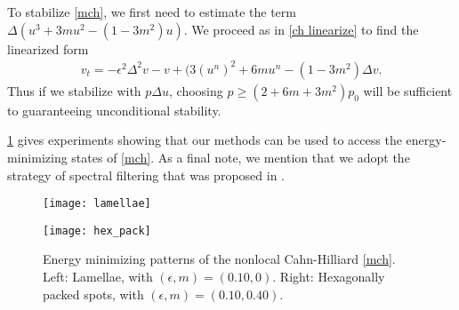 To stabilize \cref{mch}, we first need to estimate the term $\Delta(u^3 + 3mu^2-(1-3m^2)u)$. We proceed as in \cref{ch linearize} to find the linearized form
\begin{align}
v_t = -\epsilon^2\Delta^2 v - v + (3(u^n)^2 + 6mu^n - (1-3m^2) \Delta v.
\end{align}
Thus if we stabilize with $p\Delta u$, choosing $p \geq (2+6m+3m^2)p_0$ will be sufficient to guaranteeing unconditional stability.

\cref{fig:mchp energy minimizers} gives experiments showing that our methods can be used to access the energy-minimizing states of \cref{mch}. As a final note, we mention that we adopt the strategy of spectral filtering that was proposed in \cite{choksi20112d}.

\begin{figure}[htb!]
        \centering
\begin{minipage}{0.46\textwidth}
       \texttt{[image: lamellae]}
\end{minipage}
\begin{minipage}{0.46\textwidth}
\centering
       \texttt{[image: hex\_pack]}
\end{minipage}
\caption[{Energy minimizing patterns of the nonlocal Cahn-Hilliard}]{Energy minimizing patterns of the nonlocal Cahn-Hilliard \cref{mch}. Left: Lamellae, with $(\epsilon,m)=(0.10,0)$. Right: Hexagonally packed spots, with $(\epsilon,m)=(0.10,0.40)$.}
\label{fig:mchp energy minimizers}
\end{figure}
